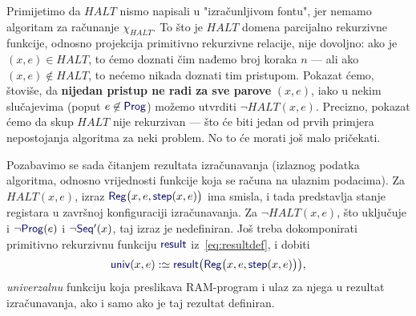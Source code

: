 Primijetimo da $HALT$ nismo napisali u "izračunljivom fontu", jer nemamo algoritam za računanje $\chi_{HALT}$. To što je $HALT$ domena parcijalno rekurzivne funkcije, odnosno projekcija primitivno rekurzivne relacije, nije dovoljno: ako je $(x,e)\in HALT$, to ćemo doznati čim nađemo broj koraka $n$ --- ali ako $(x,e)\not\in HALT$, to nećemo nikada doznati tim pristupom. Pokazat ćemo, štoviše, da \textbf{nijedan pristup ne radi za sve parove} $(x,e)$, iako u nekim slučajevima (poput $e\not\in\f{Prog}$) možemo utvrditi $\lnot HALT(x,e)$. Precizno, pokazat ćemo da skup $HALT$ nije rekurzivan --- što će biti jedan od prvih primjera nepostojanja algoritma za neki problem. No to će morati još malo pričekati.

Pozabavimo se sada čitanjem rezultata izračunavanja (izlaznog podatka algoritma, odnosno vrijednosti funkcije koja se računa na ulaznim podacima). Za $HALT(x,e)$, izraz $\f{Reg}\bigl(x,e,\f{step}(x,e)\bigr)$ ima smisla, i tada predstavlja stanje registara u završnoj konfiguraciji izračunavanja. Za $\lnot HALT(x,e)$, što uključuje i $\lnot\f{Prog}(e)$ i $\lnot\f{Seq}'(x)$, taj izraz je nedefiniran. Još treba dokomponirati primitivno rekurzivnu funkciju $\f{result}$ iz~\eqref{eq:resultdef}, i dobiti
\begin{equation}
\label{eq:univdef}\f{univ}(x,e):\simeq\f{result}\bigl(\f{Reg}\bigl(x,e,\f{step}(x,e)\bigr)\bigr)\text,
\end{equation}
\emph{univerzalnu} funkciju koja preslikava RAM-program i ulaz za njega u rezultat iz\-ra\-ču\-na\-va\-nja, ako i samo ako je taj rezultat definiran.

